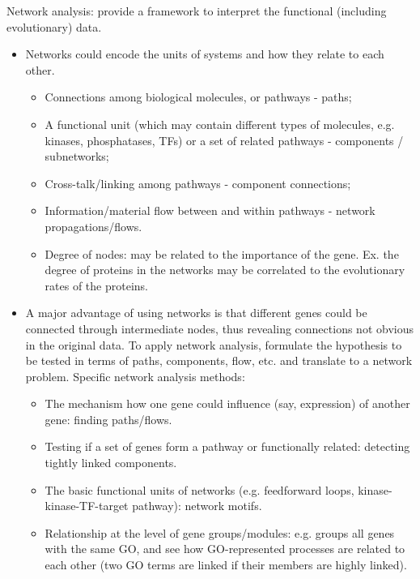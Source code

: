 \documentclass{report}
\begin{document}
Network analysis: provide a framework to interpret the functional (including evolutionary) data. 
\begin{itemize}
\item Networks could encode the units of systems and how they relate to each other. 
\begin{itemize}
	\item Connections among biological molecules, or pathways - paths;
	\item A functional unit (which may contain different types of molecules, e.g. kinases, phosphatases, TFs) or a set of related pathways - components / subnetworks; 
	\item Cross-talk/linking among pathways - component connections; 
	\item Information/material flow between and within pathways - network propagations/flows. 
	\item Degree of nodes: may be related to the importance of the gene. Ex. the degree of proteins in the networks may be correlated to the evolutionary rates of the proteins. 
\end{itemize}

\item A major advantage of using networks is that different genes could be connected through intermediate nodes, thus revealing connections not obvious in the original data. To apply network analysis, formulate the hypothesis to be tested in terms of paths, components, flow, etc. and translate to a network problem. Specific network analysis methods:  
\begin{itemize}
	\item The mechanism how one gene could influence (say, expression) of another gene: finding paths/flows. 
	\item Testing if a set of genes form a pathway or functionally related: detecting tightly linked components. 
	\item The basic functional units of networks (e.g. feedforward loops, kinase-kinase-TF-target pathway): network motifs. 
	\item Relationship at the level of gene groups/modules: e.g. groups all genes with the same GO, and see how GO-represented processes are related to each other (two GO terms are linked if their members are highly linked). 
\end{itemize}


\end{itemize}
\end{document}
